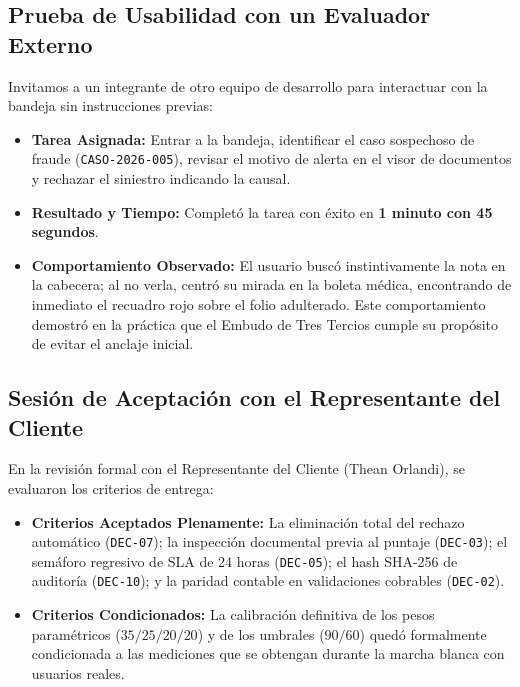 \documentclass[11pt,letterpaper]{article}
\begin{document}
\subsection{Prueba de Usabilidad con un Evaluador Externo}
Invitamos a un integrante de otro equipo de desarrollo para interactuar con la bandeja sin instrucciones previas:
\begin{itemize}
    \item \textbf{Tarea Asignada:} Entrar a la bandeja, identificar el caso sospechoso de fraude (\texttt{CASO-2026-005}), revisar el motivo de alerta en el visor de documentos y rechazar el siniestro indicando la causal.
    \item \textbf{Resultado y Tiempo:} Completó la tarea con éxito en \textbf{1 minuto con 45 segundos}.
    \item \textbf{Comportamiento Observado:} El usuario buscó instintivamente la nota en la cabecera; al no verla, centró su mirada en la boleta médica, encontrando de inmediato el recuadro rojo sobre el folio adulterado. Este comportamiento demostró en la práctica que el Embudo de Tres Tercios cumple su propósito de evitar el anclaje inicial.
\end{itemize}

\subsection{Sesión de Aceptación con el Representante del Cliente}
En la revisión formal con el Representante del Cliente (Thean Orlandi), se evaluaron los criterios de entrega:
\begin{itemize}
    \item \textbf{Criterios Aceptados Plenamente:} La eliminación total del rechazo automático (\texttt{DEC-07}); la inspección documental previa al puntaje (\texttt{DEC-03}); el semáforo regresivo de SLA de 24 horas (\texttt{DEC-05}); el hash SHA-256 de auditoría (\texttt{DEC-10}); y la paridad contable en validaciones cobrables (\texttt{DEC-02}).
    \item \textbf{Criterios Condicionados:} La calibración definitiva de los pesos paramétricos ($35/25/20/20$) y de los umbrales ($90/60$) quedó formalmente condicionada a las mediciones que se obtengan durante la marcha blanca con usuarios reales.
\end{itemize}

\newpage

\end{document}
